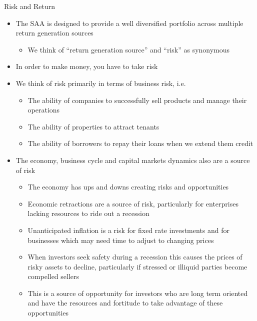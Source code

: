 \documentclass[10pt,english]{beamer}\usepackage[]{graphicx}\usepackage[]{color}
\begin{document}
\begin{frame}{Risk and Return}
\begin{itemize}
\item The SAA is designed to provide a well diversified portfolio across
multiple return generation sources
\begin{itemize}
\item {\footnotesize{}We think of ``return generation source'' and ``risk''
as synonymous} 
\end{itemize}
\item In order to make money, you have to take risk
\item We think of risk primarily in terms of business risk, i.e.
\begin{itemize}
\item {\footnotesize{}The ability of companies to successfully sell products
and manage their operations}{\footnotesize \par}
\item {\footnotesize{}The ability of properties to attract tenants}{\footnotesize \par}
\item {\footnotesize{}The ability of borrowers to repay their loans when
we extend them credit}{\footnotesize \par}
\end{itemize}
\item The economy, business cycle and capital markets dynamics also are
a source of risk
\begin{itemize}
\item {\footnotesize{}The economy has ups and downs creating risks and opportunities}{\footnotesize \par}
\item {\footnotesize{}Economic retractions are a source of risk, particularly
for enterprises lacking resources to ride out a recession}{\footnotesize \par}
\item {\footnotesize{}Unanticipated inflation is a risk for fixed rate investments
and for businesses which may need time to adjust to changing prices}{\footnotesize \par}
\item {\footnotesize{}When investors seek safety during a recession this
causes the prices of risky assets to decline, particularly if stressed
or illiquid parties become compelled sellers}{\footnotesize \par}
\item {\footnotesize{}This is a source of opportunity for investors who
are long term oriented and have the resources and fortitude to take
advantage of these opportunities}{\footnotesize \par}
\end{itemize}
\end{itemize}
\end{frame}
\end{document}
